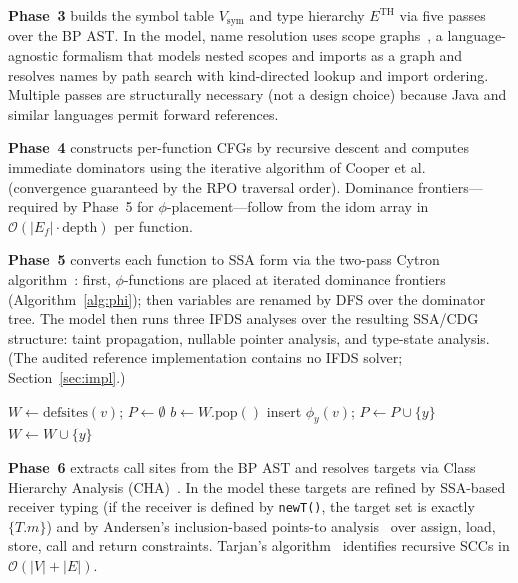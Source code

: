 \documentclass[journal,10pt,twoside]{IEEEtran}
\newcommand{\VSYM}{V_{\!\mathrm{sym}}}
\newcommand{\ETH}{E^{\mathrm{TH}}}
\newcommand{\DF}{\mathrm{DF}}
\newcommand{\BigO}{\mathcal{O}}
\begin{document}
\textbf{Phase~3} builds the symbol table $\VSYM$ and type
hierarchy $\ETH$ via five passes over the BP AST.  In the
model, name resolution uses scope graphs~\cite{antwerpen16},
a language-agnostic formalism that models nested scopes and
imports as a graph and resolves names by path search with
kind-directed lookup and import ordering.  Multiple passes are
structurally necessary (not a design choice) because Java
and similar languages permit forward references.

\textbf{Phase~4} constructs per-function CFGs by recursive
descent and computes immediate dominators using the
iterative algorithm of Cooper et al.~\cite{cooper01}
(convergence guaranteed by the RPO traversal order).
Dominance frontiers---required by Phase~5 for
$\phi$-placement---follow from the idom array in
$\BigO(|E_f| \cdot \mathrm{depth})$ per function.

\textbf{Phase~5} converts each function to SSA form via the
two-pass Cytron algorithm~\cite{cytron91}: first,
$\phi$-functions are placed at iterated dominance frontiers
(Algorithm~\ref{alg:phi}); then variables are renamed by DFS
over the dominator tree.  The model then runs three IFDS
analyses over the resulting SSA/CDG structure: taint
propagation, nullable pointer analysis, and type-state
analysis.  (The audited reference implementation contains no
IFDS solver; Section~\ref{sec:impl}.)

\begin{algorithm}[t]
\caption{$\phi$-Function Placement~\cite{cytron91}}
\label{alg:phi}
\small
\begin{algorithmic}[1]
  \State $W \gets \mathrm{defsites}(v)$;\; $P \gets \emptyset$
    \State $b \gets W.\mathrm{pop}()$
    \ForAll{$y \in \DF[b]$}
        \State insert $\phi_y(v)$;\;
          $P \gets P \cup \{y\}$
          \State $W \gets W \cup \{y\}$
        \EndIf
      \EndIf
    \EndFor
  \EndWhile
\EndFor
\end{algorithmic}
\end{algorithm}

\textbf{Phase~6} extracts call sites from the BP AST and
resolves targets via Class Hierarchy Analysis
(CHA)~\cite{lhotak03}.  In the model these targets are
refined by SSA-based receiver typing (if the receiver is
defined by \texttt{new\;T()}, the target set is exactly
$\{T.m\}$) and by Andersen's inclusion-based points-to
analysis~\cite{anderson94} over assign, load, store, call and
return constraints.
Tarjan's algorithm~\cite{tarjan72} identifies recursive
SCCs in $\BigO(|V|+|E|)$.
\end{document}
